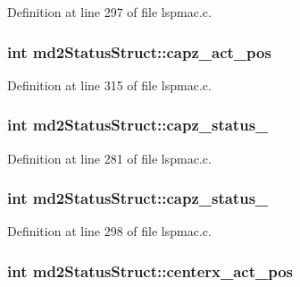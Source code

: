 Definition at line 297 of file lspmac.\-c.

\hypertarget{structmd2StatusStruct_a257c04efac3a33d5d34b21d64c6f1266}{
\subsubsection[{capz\-\_\-act\-\_\-pos}]{\setlength{\rightskip}{0pt plus 5cm}int md2\-Status\-Struct\-::capz\-\_\-act\-\_\-pos}}\label{structmd2StatusStruct_a257c04efac3a33d5d34b21d64c6f1266}


Definition at line 315 of file lspmac.\-c.

\hypertarget{structmd2StatusStruct_a719db4477f35331eaa8b7b44150e88a2}{
\subsubsection[{capz\-\_\-status\-\_\-1}]{\setlength{\rightskip}{0pt plus 5cm}int md2\-Status\-Struct\-::capz\-\_\-status\-\_}}\label{structmd2StatusStruct_a719db4477f35331eaa8b7b44150e88a2}


Definition at line 281 of file lspmac.\-c.

\hypertarget{structmd2StatusStruct_a3abb998bb89433aed16121d0dae6275a}{
\subsubsection[{capz\-\_\-status\-\_\-2}]{\setlength{\rightskip}{0pt plus 5cm}int md2\-Status\-Struct\-::capz\-\_\-status\-\_}}\label{structmd2StatusStruct_a3abb998bb89433aed16121d0dae6275a}


Definition at line 298 of file lspmac.\-c.

\hypertarget{structmd2StatusStruct_ae7924b6e91e1de82f6f7910cb3a9c9bd}{
\subsubsection[{centerx\-\_\-act\-\_\-pos}]{\setlength{\rightskip}{0pt plus 5cm}int md2\-Status\-Struct\-::centerx\-\_\-act\-\_\-pos}}\label{structmd2StatusStruct_ae7924b6e91e1de82f6f7910cb3a9c9bd}


